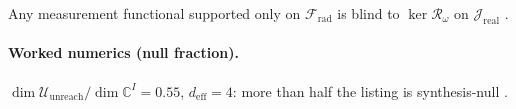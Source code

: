 \begin{corollary}
\label{cor:ch4.farzone-nr-blind}
Any measurement functional supported only on \(\mathcal{F}_{\mathrm{rad}}\) is blind to \(\ker\mathcal{R}_\omega\) on \(\mathcal{J}_{\mathrm{real}}\)
\cite{stratton1941,harrington2001,devaney2004,hansen1988}.
\end{corollary}

\paragraph{Worked numerics (null fraction).}
\(\dim\mathcal{U}_{\mathrm{unreach}}/\dim\mathbb{C}^{I}=0.55\), \(d_{\mathrm{eff}}=4\): more than half the listing is synthesis-null
\cite{hansen1988,harrington2001}.
